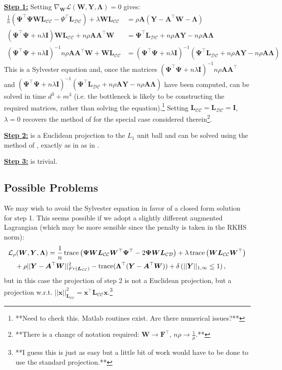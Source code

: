 \documentclass[letterpaper]{article}
\newcommand{\CsabaFLAM}{DBLP:conf/adprl/YaoSPZ14}
\newcommand{\DuchiProjections}{DBLP:conf/icml/DuchiSSC08}
\newcommand{\cD}{{\mathcal D}}
\newcommand{\cC}{{\mathcal C}}
\newcommand{\cL}{{\mathcal L}}
\newcommand{\bLambda}{{\bm \Lambda}}
\newcommand{\bL}{{\bm L}}
\newcommand{\bW}{{\bm W}}
\newcommand{\bA}{{\bm A}}
\newcommand{\bI}{{\bm I}}
\newcommand{\bY}{{\bm Y}}
\newcommand{\bx}{{\bm x}}
\newcommand{\bF}{{\bm F}}
\newcommand{\bPsi}{{\bm \Psi}}
\newcommand{\trace}{\operatornamewithlimits{trace}}
\newcommand{\nn}{\nonumber}
\begin{document}
\underline{\bf Step 1:} Setting $\nabla_{\bW} \cL(\bW,\bY,\bLambda) = 0$ gives:
\begin{align}
 \frac{1}{n}(\bPsi^\top \bPsi \bW \bL_{\cC\cC} - \Psi^\top\bL_{\cD\cC}) + \lambda\bW\bL_{\cC\cC}  &= \rho\bA(\bY-\bA^\top\bW-\bLambda) \nn\\
(\bPsi^\top \bPsi + n\lambda\bI)\bW \bL_{\cC\cC} + n\rho \bA\bA^\top\bW &= \bPsi^\top\bL_{\cD\cC} + n\rho\bA\bY - n\rho\bA\bLambda\nn\\
(\bPsi^\top \bPsi + n\lambda\bI)^{-1}n\rho \bA\bA^\top \bW + \bW \bL_{\cC\cC} &= (\bPsi^\top \bPsi + n\lambda\bI)^{-1}(\bPsi^\top\bL_{\cD\cC} + n\rho\bA\bY - n\rho\bA\bLambda)
\end{align}
This is a Sylvester equation and, once the matrices $(\bPsi^\top \bPsi + n\lambda\bI)^{-1}n\rho \bA\bA^\top$ and $(\bPsi^\top \bPsi + n\lambda\bI)^{-1}(\bPsi^\top\bL_{\cD\cC} + n\rho\bA\bY - n\rho\bA\bLambda)$ have been computed, can be solved in time $d^3+m^3$ (i.e. the bottleneck is likely to be constructing the required matrices, rather than solving the equation).\footnote{**Need to check this. Matlab routines exist. Are there numerical issues?**} Setting $\bL_{\cC\cC} = \bL_{\cD\cC} = \bI$, $\lambda= 0$ recovers the method of \cite{\CsabaFLAM} for the special case considered therein\footnote{**There is a change of notation required: $\bW \rightarrow \bF^\top$, $n\rho \rightarrow \frac{1}{\mu}$.**}.

\underline{\bf Step 2:} is a Euclidean projection to the $L_1$ unit ball and can be solved using the method of \cite{\DuchiProjections}, exactly as in as in \cite{\CsabaFLAM}.

\underline{\bf Step 3:} is trivial.

\subsection{Possible Problems}

We may wish to avoid the Sylvester equation in favor of a closed form solution for step 1. This seems possible if we adopt a slightly different augmented Lagrangian (which may be more sensible since the penalty is taken in the RKHS norm):
\begin{align}
&\cL_\rho(\bW,\bY,\bLambda) = \frac{1}{n} \trace\left( \bPsi \bW \bL_{\cC\cC} \bW^\top \bPsi^\top - 2\bPsi\bW\bL_{\cC\cD}  \right)  + \lambda   \trace\left(\bW \bL_{\cC\cC} \bW^\top\right)\nn\\
&\quad + \rho||\bY-\bA^\top\bW||^2_{Fr(\bL_{\cC\cC})} - \trace(\bLambda^\top(\bY - \bA^\top\bW))+ \delta\left( ||\bY||_{1,\infty} \le 1 \right) , \label{AugmentedLagrangian2}
\end{align}
but in this case the projection of step 2 is not a Euclidean projection, but a projection w.r.t. $||\bx||^2_{\bL_{\cC\cC}} = \bx^\top\bL_{\cC\cC} \bx$.\footnote{**I guess this is just as easy but a little bit of work would have to be done to use the standard projection.**}
\end{document}
